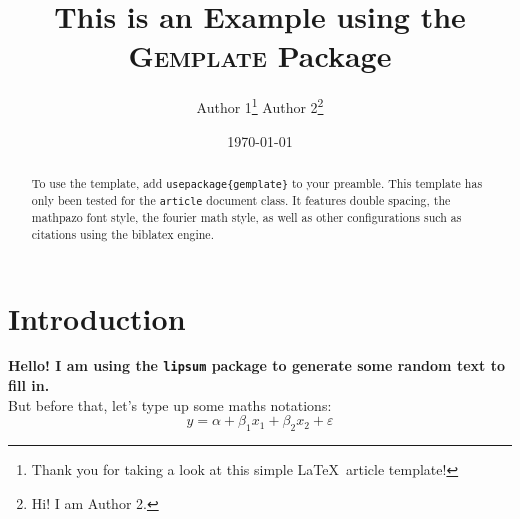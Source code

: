 \documentclass[12pt]{article}
\title{This is an Example using the \textsc{Gemplate} Package}
\author{Author 1\thanks{\protect\linespread{1}\protect\selectfont Thank you for taking a look at this simple \LaTeX \ article template!} \hspace{15ex}
Author 2\thanks{\protect\linespread{1}\protect\selectfont Hi! I am Author 2.}}
\date{\today}
\begin{document}
\maketitle

\begin{abstract}
    To use the template, add \texttt{usepackage\{gemplate\}} to your preamble. This template has only been tested for the \texttt{article} document class. It features double spacing, the mathpazo font style, the fourier math style, as well as other configurations such as citations using the biblatex engine.
\end{abstract}

\newpage

\section{Introduction}
\textbf{Hello! I am using the \texttt{lipsum} package to generate some random text to fill in.} ~\\

But before that, let's type up some maths notations:
$$
    y = \alpha + \beta_1x_1 + \beta_2x_2 + \varepsilon
$$

\lipsum[2-3]
\end{document}
